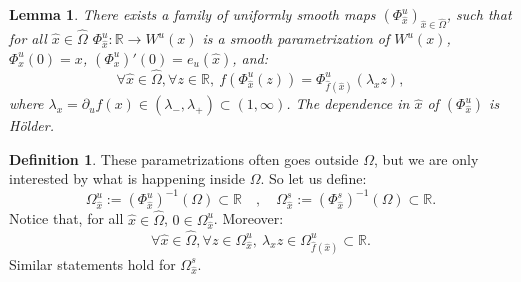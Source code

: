 \documentclass[a4paper]{article}
\newtheorem{lemma}[theorem]{Lemma}
\theoremstyle{definition}
\newtheorem{definition}{Definition}[section]
\begin{document}

\begin{lemma}
There exists a family of uniformly smooth maps $(\Phi^u_{\widehat{x}})_{{\widehat{x}} \in \widehat{\Omega}}$, such that for all ${\widehat{x}} \in \widehat{\Omega}$ $\Phi_{\widehat{x}}^u : \mathbb{R} \longrightarrow W^u(x)$
is a smooth parametrization of $W^u(x)$, $\Phi_x^u(0)=x$, $(\Phi_x^u)'(0)=e_u({\widehat{x}})$, and:
$$ \forall {\widehat{x}} \in \widehat{\Omega}, \forall z \in \mathbb{R}, \ f\left( \Phi_{\widehat{x}}^u(z) \right) = \Phi_{\widehat{f}({\widehat{x}})}^u( {\lambda}_x z ),  $$
where $\lambda_x = \partial_u f(x) \in (\lambda_-,\lambda_+) \subset (1,\infty)$. The dependence in ${\widehat{x}}$ of $(\Phi_{\widehat{x}}^u)$ is Hölder.
\end{lemma}

\begin{definition}
These parametrizations often goes outside $\Omega$, but we are only interested by what is happening inside $\Omega$. So let us define:
$$ \Omega_{\widehat{x}}^u := (\Phi_{\widehat{x}}^u)^{-1}(\Omega) \subset \mathbb{R} \quad, \quad \Omega_{\widehat{x}}^s := (\Phi_{\widehat{x}}^s)^{-1}({\Omega}) \subset \mathbb{R} .$$
Notice that, for all ${\widehat{x}} \in \widehat{\Omega}$,  $ 0 \in \Omega_{\widehat{x}}^u $. Moreover:
$$ \forall {\widehat{x}} \in \widehat{\Omega}, \forall z \in \Omega_{{\widehat{x}}}^u, \ {\lambda}_x z \in \Omega_{\widehat{f}({\widehat{x}})}^u \subset \mathbb{R} .$$
Similar statements hold for $\Omega_{\widehat{x}}^s$.
\end{definition}
\end{document}
